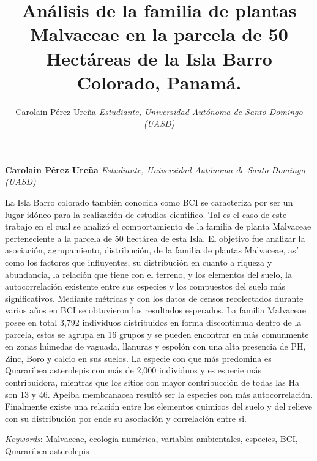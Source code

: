\documentclass[11pt,]{article}
\title{Análisis de la familia de plantas Malvaceae en la parcela de 50
Hectáreas de la Isla Barro Colorado, Panamá.  }
\author{\Large Carolain Pérez Ureña\vspace{0.05in} \newline\normalsize\emph{Estudiante, Universidad Autónoma de Santo Domingo (UASD)}  }
\date{}
\newcommand*{\authorfont}{\fontfamily{phv}\selectfont}
\renewenvironment{abstract}
 {{%
    \setlength{\leftmargin}{0mm}
    \setlength{\rightmargin}{\leftmargin}%
  }%
  \relax}
 {\endlist}
\begin{document}
	
%

{%
\setlength{\parindent}{0pt}
\thispagestyle{plain}
{\fontsize{18}{20}\selectfont\raggedright 
\maketitle  %

}

{
   \vskip 13.5pt\relax \normalsize\fontsize{11}{12} 
\textbf{\authorfont Carolain Pérez Ureña} \hskip 15pt \emph{\small Estudiante, Universidad Autónoma de Santo Domingo (UASD)}   

}

}








\begin{abstract}

    \hbox{\vrule height .2pt width 39.14pc}

    \vskip 8.5pt %

\noindent La Isla Barro colorado también conocida como BCI se caracteriza por ser
un lugar idóneo para la realización de estudios cientifico. Tal es el
caso de este trabajo en el cual se analizó el comportamiento de la
familia de planta Malvaceae perteneciente a la parcela de 50 hectárea de
esta Isla. El objetivo fue analizar la asociación, agrupamiento,
distribución, de la familia de plantas Malvaceae, así como los factores
que influyentes, su distribución en cuanto a riqueza y abundancia, la
relación que tiene con el terreno, y los elementos del suelo, la
autocorrelación existente entre sus especies y los compuestos del suelo
más significativos. Mediante métricas y con los datos de censos
recolectados durante varios años en BCI se obtuvieron los resultados
esperados. La familia Malvaceae posee en total 3,792 individuos
distribuidos en forma discontinuua dentro de la parcela, estos se agrupa
en 16 grupos y se pueden encontrar en más comunmente en zonas húmedas de
vaguada, llanuras y espolón con una alta presencia de PH, Zinc, Boro y
calcio en sus suelos. La especie con que más predomina es Quararibea
asterolepis con más de 2,000 individuos y es especie más contribuidora,
mientras que los sitios con mayor contribucción de todas las Ha son 13 y
46. Apeiba membranacea resultó ser la especies con más autocorrelación.
Finalmente existe una relación entre los elementos quimicos del suelo y
del relieve con su distribución por ende su asociación y correlación
entre si.


\vskip 8.5pt \noindent \emph{Keywords}: Malvaceae, ecología numérica, variables ambientales, especies, BCI,
Quararibea asterolepis \par

    \hbox{\vrule height .2pt width 39.14pc}



\end{abstract}
\end{document}
